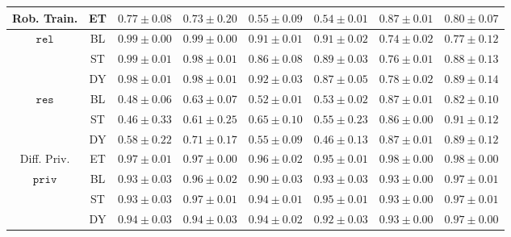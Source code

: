 \begin{tabular}{cc||cc|cc|cc|}
    \hline\hline
    Rob. Train.& ET & $0.77 \pm 0.08$ & $0.73 \pm 0.20$ & $0.55 \pm 0.09$ & $0.54 \pm 0.01$ & $0.87 \pm 0.01$ & $0.80 \pm 0.07$ \\
    \hline
    \multirow{3}{*}{$\mathtt{rel}$}
    & BL & $0.99 \pm 0.00$ & $0.99 \pm 0.00$ & $0.91 \pm 0.01$ & $0.91 \pm 0.02$ & $0.74 \pm 0.02$ & $0.77 \pm 0.12$ \\
    & ST & $0.99 \pm 0.01$ & $0.98 \pm 0.01$ & $0.86 \pm 0.08$ & $0.89 \pm 0.03$ & $0.76 \pm 0.01$ & $0.88 \pm 0.13$ \\
    & DY & $0.98 \pm 0.01$ & $0.98 \pm 0.01$ & $0.92 \pm 0.03$ & $0.87 \pm 0.05$ & $0.78 \pm 0.02$ & $0.89 \pm 0.14$ \\
    \hline
    \multirow{3}{*}{$\mathtt{res}$}
    & BL & $0.48 \pm 0.06$ & $0.63 \pm 0.07$ & $0.52 \pm 0.01$ & $0.53 \pm 0.02$ & $0.87 \pm 0.01$ & $0.82 \pm 0.10$ \\
    & ST & $0.46 \pm 0.33$ & $0.61 \pm 0.25$ & $0.65 \pm 0.10$ & $0.55 \pm 0.23$ & $0.86 \pm 0.00$ & $0.91 \pm 0.12$ \\
    & DY & $0.58 \pm 0.22$ & $0.71 \pm 0.17$ & $0.55 \pm 0.09$ & $0.46 \pm 0.13$ & $0.87 \pm 0.01$ & $0.89 \pm 0.12$ \\
    \hline\hline
    Diff. Priv.& ET & $0.97 \pm 0.01$ & $0.97 \pm 0.00$ & $0.96 \pm 0.02$ & $0.95 \pm 0.01$ & $0.98 \pm 0.00$ & $0.98 \pm 0.00$ \\
    \hline
    \multirow{3}{*}{$\mathtt{priv}$}
    & BL & $0.93 \pm 0.03$ & $0.96 \pm 0.02$ & $0.90 \pm 0.03$ & $0.93 \pm 0.03$ & $0.93 \pm 0.00$ & $0.97 \pm 0.01$ \\
    & ST & $0.93 \pm 0.03$ & $0.97 \pm 0.01$ & $0.94 \pm 0.01$ & $0.95 \pm 0.01$ & $0.93 \pm 0.00$ & $0.97 \pm 0.01$ \\
    & DY & $0.94 \pm 0.03$ & $0.94 \pm 0.03$ & $0.94 \pm 0.02$ & $0.92 \pm 0.03$ & $0.93 \pm 0.00$ & $0.97 \pm 0.00$ \\
    \hline
\end{tabular}
